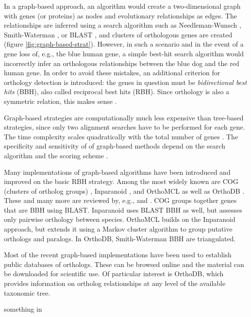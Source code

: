 In a graph-based approach, an algorithm would create a two-dimensional graph
with genes (or proteins) as nodes and evolutionary relationships as edges. The
relationships are inferred using a search algorithm such as Needleman-Wunsch
\citeyearpar{needleman1970}, Smith-Waterman \citeyearpar{smith1981}, or BLAST
\citep{altschul1990}, and clusters of orthologous genes are created (figure
\ref{fig:graph-based-strat}). However, in such a scenario and in the event of a
gene loss of, e.g., the blue human gene, a simple best-hit search algorithm
would incorrectly infer an orthologous relationships between the blue dog and
the red human gene. In order to avoid these mistakes, an additional criterion
for orthology detection is introduced: the genes in question must be
\emph{bidirectional best hits} (BBH), also called reciprocal best hits (RBH).
Since orthology is also a symmetric relation, this makes sense .



Graph-based strategies are computationally much less expensive than tree-based
strategies, since only two alignment searches have to be performed for each
gene. The time complexity scales quadratically with the total number of genes
\citep{altenhoff2012-1}. 
The specificity and sensitivity of of graph-based methods depend on the search
algorithm and the scoring scheme \citep{hulsen2006}.

Many implementations of graph-based algorithms have been introduced and improved
on the basic RBH strategy. Among the most widely known are COG (clusters of
ortholog groups) \citep{tatusov2003}, Inparanoid \citep{ostlund2010}, and
OrthoMCL \citep{li2003} as well as OrthoDB \citep{waterhouse2011}. These and
many more are reviewed by, e.g., \citet{kuzniar2008} and \citet{forslund2011}.
COG groups together genes that are BBH using BLAST. Inparanoid uses BLAST BBH as
well, but assesses only pairwise orthology between species. OrthoMCL builds on
the Inparanoid approach, but extends it using a Markov cluster algorithm to
group putative orthologs and paralogs. In OrthoDB, Smith-Waterman BBH are
triangulated.

Most of the recent graph-based implementations have been used to establish
public databases of orthologs. These can be browsed online and the material can
be downloaded for scientific use. Of particular interest is OrthoDB, which
provides information on ortholog relationships at any level of the available
taxonomic tree. 

something in \citet{page1997}

